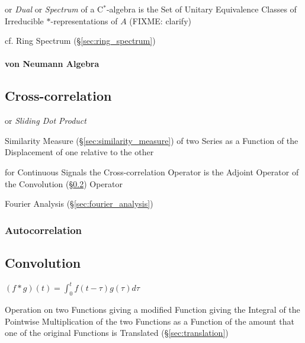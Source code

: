 or \emph{Dual} or \emph{Spectrum} of a C$^*$-algebra is the Set of Unitary
Equivalence Classes of Irreducible $*$-representations of $A$ (FIXME: clarify)

cf. Ring Spectrum (\S\ref{sec:ring_spectrum})



\paragraph{von Neumann Algebra}\label{sec:vonneumann_algebra}\hfill



\subsection{Cross-correlation}\label{sec:cross_correlation}

or \emph{Sliding Dot Product}

Similarity Measure (\S\ref{sec:similarity_measure}) of two Series as a Function
of the Displacement of one relative to the other

for Continuous Signals the Cross-correlation Operator is the Adjoint Operator
of the Convolution (\S\ref{sec:convolution}) Operator

\fist Fourier Analysis (\S\ref{sec:fourier_analysis})



\subsubsection{Autocorrelation}\label{sec:autocorrelation}



\subsection{Convolution}\label{sec:convolution}

$(f * g)(t) = \int_0^t f(t-\tau) g(\tau) d\tau$

Operation on two Functions giving a modified Function giving the Integral of
the Pointwise Multiplication of the two Functions as a Function of the amount
that one of the original Functions is Translated (\S\ref{sec:translation})


